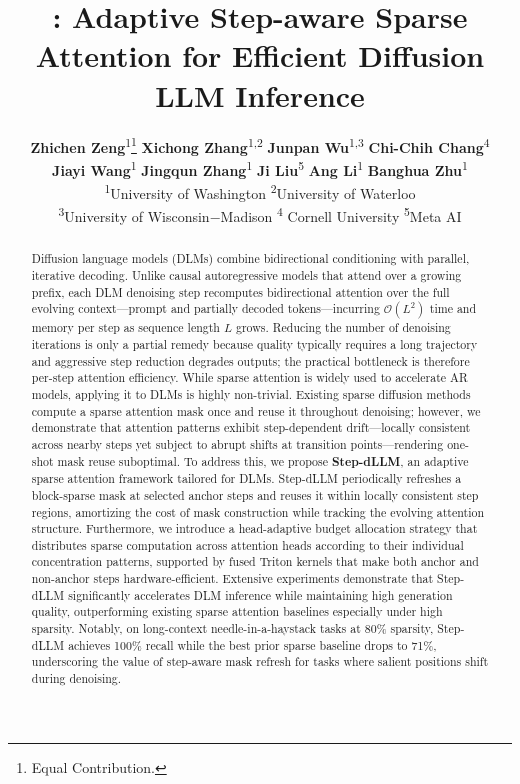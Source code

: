 \documentclass{article}
\title{\name: Adaptive Step-aware Sparse Attention for Efficient Diffusion LLM Inference}
\author{%
  \textbf{Zhichen Zeng}\textsuperscript{1}\thanks{Equal Contribution.}\hspace{4pt}
  \quad
  \textbf{Xichong Zhang}\textsuperscript{1,}\textsuperscript{2}\footnotemark[1] 
  \quad
  \textbf{Junpan Wu}\textsuperscript{1,}\textsuperscript{3}
  \quad
  \textbf{Chi-Chih Chang}\textsuperscript{4}\\
  \textbf{Jiayi Wang}\textsuperscript{1} 
  \quad
  \textbf{Jingqun Zhang}\textsuperscript{1}
  \quad
  \textbf{Ji Liu}\textsuperscript{5}
  \quad
  \textbf{Ang Li}\textsuperscript{1}
  \quad
  \textbf{Banghua Zhu}\textsuperscript{1}
  \\
  \textsuperscript{1}University of Washington 
  \quad
  \textsuperscript{2}University of Waterloo\\
  \textsuperscript{3}University of Wisconsin$-$Madison
  \quad
  \textsuperscript{4} Cornell University
  \quad
  \textsuperscript{5}Meta AI
  \quad
}
\theoremstyle{plain}
\theoremstyle{definition}
\theoremstyle{remark}
\begin{document}
\maketitle

\begin{abstract}
Diffusion language models (DLMs) combine bidirectional conditioning with parallel, iterative decoding. Unlike causal autoregressive models that attend over a growing prefix, each DLM denoising step recomputes bidirectional attention over the full evolving context---prompt and partially decoded tokens---incurring $\mathcal{O}(L^2)$ time and memory per step as sequence length $L$ grows. Reducing the number of denoising iterations is only a partial remedy because quality typically requires a long trajectory and aggressive step reduction degrades outputs; the practical bottleneck is therefore per-step attention efficiency. While sparse attention is widely used to accelerate AR models, applying it to DLMs is highly non-trivial. Existing sparse diffusion methods compute a sparse attention mask once and reuse it throughout denoising; however, we demonstrate that attention patterns exhibit step-dependent drift---locally consistent across nearby steps yet subject to abrupt shifts at transition points---rendering one-shot mask reuse suboptimal. To address this, we propose \textbf{Step-dLLM}, an adaptive sparse attention framework tailored for DLMs. Step-dLLM periodically refreshes a block-sparse mask at selected anchor steps and reuses it within locally consistent step regions, amortizing the cost of mask construction while tracking the evolving attention structure. Furthermore, we introduce a head-adaptive budget allocation strategy that distributes sparse computation across attention heads according to their individual concentration patterns, supported by fused Triton kernels that make both anchor and non-anchor steps hardware-efficient. Extensive experiments demonstrate that Step-dLLM significantly accelerates DLM inference while maintaining high generation quality, outperforming existing sparse attention baselines especially under high sparsity. Notably, on long-context needle-in-a-haystack tasks at 80\% sparsity, Step-dLLM achieves 100\% recall while the best prior sparse baseline drops to 71\%, underscoring the value of step-aware mask refresh for tasks where salient positions shift during denoising.
\end{abstract}






\end{document}
